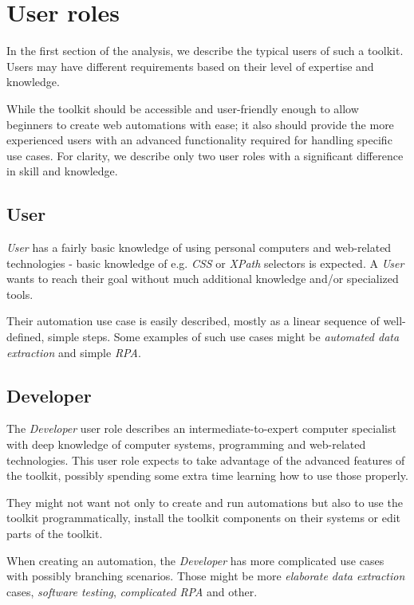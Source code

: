 \section{User roles} \label{userroles}

In the first section of the analysis, we describe the typical users of such a toolkit.
Users may have different requirements based on their level of expertise and knowledge.

While the toolkit should be accessible and user-friendly enough to allow beginners to
create web automations with ease; it also should provide the more experienced users with 
an advanced functionality required for handling specific use cases. 
For clarity, we describe only two user roles with a significant difference in skill and knowledge. 

\subsection{User} \label{UserUserRole}
\textit{User} has a fairly basic knowledge of using personal computers 
and web-related technologies - basic knowledge of e.g. \textit{CSS} or \textit{XPath} selectors is expected.
A \textit{User} wants to reach their goal without much additional knowledge and/or specialized tools.

Their automation use case is easily described, mostly as a linear sequence of well-defined, simple steps.
Some examples of such use cases might be \textit{automated data extraction} and simple \textit{\acl{RPA}}.


\subsection{Developer} \label{DevUserRole}
The \textit{Developer} user role describes an intermediate-to-expert computer specialist with deep
knowledge of computer systems, programming and web-related technologies.
This user role expects to take advantage of the advanced features of the toolkit, possibly spending some extra time learning how to use those properly.

They might not want not only to create and run automations but also to use the toolkit programmatically, 
install the toolkit components on their systems or edit parts of the toolkit. 

When creating an automation, the \textit{Developer} has more complicated use cases with possibly branching scenarios. 
Those might be more \textit{elaborate data extraction} cases, \textit{software testing}, \textit{complicated \ac{RPA}} and other.